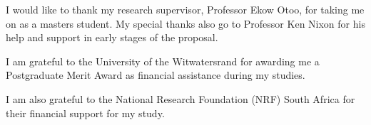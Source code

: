 
\begin{acknowledgements}
I would like to thank my research supervisor, Professor Ekow Otoo, for taking me on as a masters student. %
My special thanks also go to Professor Ken Nixon for his help and support in early stages of the proposal.

I am grateful to the University of the Witwatersrand for awarding me a Postgraduate Merit Award as financial assistance during my studies.

I am also grateful to the National Research Foundation (NRF) South Africa for their financial support for my study.
\end{acknowledgements}

